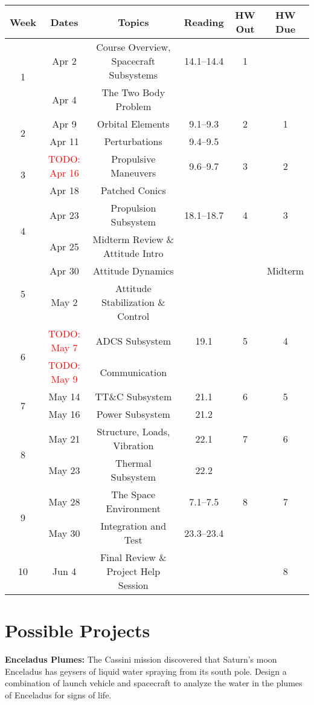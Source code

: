 \documentclass[11pt,letterpaper]{article}
\newcommand{\todo}[1]{\textcolor{red}{TODO: #1}}
\begin{document}
\begin{tabular}{c|c|c|c|c|c}
	Week & Dates & Topics & Reading & HW Out & HW Due \\
	\hline
	\multirow{2}{*}{1} & Apr 2 & Course Overview, Spacecraft Subsystems & 14.1--14.4 & 1 & \\
	 & Apr 4 & The Two Body Problem & & & \\
	\hline
	\multirow{2}{*}{2} & Apr 9 & Orbital Elements & 9.1--9.3 & 2 & 1 \\
	 & Apr 11 & Perturbations & 9.4--9.5 & & \\
	\hline
	\multirow{2}{*}{3}  & \todo{Apr 16} & Propulsive Maneuvers & 9.6--9.7 & 3 & 2\\
	 & Apr 18 & Patched Conics & & & \\
	\hline
	\multirow{2}{*}{4}  & Apr 23 & Propulsion Subsystem & 18.1--18.7 & 4 & 3\\
	 & Apr 25 & Midterm Review \& Attitude Intro & & & \\
	\hline
	\multirow{2}{*}{5}  & Apr 30 & Attitude Dynamics & & & Midterm\\
	 & May 2 & Attitude Stabilization \& Control & & & \\
	\hline
	\multirow{2}{*}{6}  & \todo{May 7} & ADCS Subsystem & 19.1 & 5 & 4\\
	 & \todo{May 9} & Communication & & & \\
	\hline
	\multirow{2}{*}{7}  & May 14 & TT\&C Subsystem & 21.1 & 6 & 5\\
	 & May 16 & Power Subsystem & 21.2 & & \\
	\hline
	\multirow{2}{*}{8}  & May 21 & Structure, Loads, Vibration & 22.1 & 7 & 6\\
	 & May 23 & Thermal Subsystem & 22.2 & & \\
	\hline
	\multirow{2}{*}{9}  & May 28 & The Space Environment & 7.1--7.5 & 8 & 7\\
	 & May 30 & Integration and Test & 23.3--23.4 & & \\
	\hline
	10 & Jun 4 & Final Review \& Project Help Session & & & 8\\
\end{tabular}

\section*{Possible Projects}

\textbf{Enceladus Plumes:} The Cassini mission discovered that Saturn's moon Enceladus has geysers of liquid water spraying from its south pole. Design a combination of launch vehicle and spacecraft to analyze the water in the plumes of Enceladus for signs of life.
\end{document}
